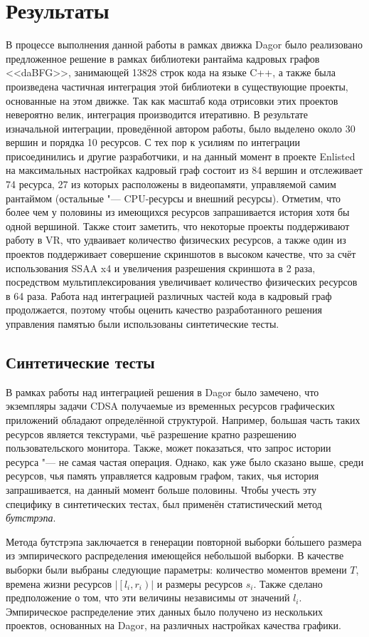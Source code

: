 \section{Результаты}
В процессе выполнения данной работы в рамках движка Dagor было реализовано предложенное решение в рамках библиотеки рантайма кадровых графов <<daBFG>>, занимающей 13828 строк кода на языке C++, а также была произведена частичная интеграция этой библиотеки в существующие проекты, основанные на этом движке.
Так как масштаб кода отрисовки этих проектов невероятно велик, интеграция производится итеративно.
В результате изначальной интеграции, проведённой автором работы, было выделено около 30 вершин и порядка 10 ресурсов.
С тех пор к усилиям по интеграции присоединились и другие разработчики, и на данный момент в проекте Enlisted на максимальных настройках кадровый граф состоит из 84 вершин и отслеживает 74 ресурса, 27 из которых расположены в видеопамяти, управляемой самим рантаймом (остальные "--- CPU-ресурсы и внешний ресурсы).
Отметим, что более чем у половины из имеющихся ресурсов запрашивается история хотя бы одной вершиной.
Также стоит заметить, что некоторые проекты поддерживают работу в VR, что удваивает количество физических ресурсов, а также один из проектов поддерживает совершение скриншотов в высоком качестве, что за счёт использования SSAA x4 и увеличения разрешения скриншота в 2 раза, посредством мультиплексирования увеличивает количество физических ресурсов в 64 раза.
Работа над интеграцией различных частей кода в кадровый граф продолжается, поэтому чтобы оценить качество разработанного решения управления памятью были использованы синтетические тесты.

\subsection{Синтетические тесты}
В рамках работы над интеграцией решения в Dagor было замечено, что экземпляры задачи CDSA получаемые из временных ресурсов графических приложений обладают определённой структурой.
Например, большая часть таких ресурсов является текстурами, чьё разрешение кратно разрешению пользовательского монитора.
Также, может показаться, что запрос истории ресурса "--- не самая частая операция.
Однако, как уже было сказано выше, среди ресурсов, чья память управляется кадровым графом, таких, чья история запрашивается, на данный момент больше половины.
Чтобы учесть эту специфику в синтетических тестах, был применён статистический метод \textit{бутстрэпа}.

Метода бутстрэпа заключается в генерации повторной выборки б\'ольшего размера из эмпирического распределения имеющейся небольшой выборки.
В качестве выборки были выбраны следующие параметры: количество моментов времени $T$, времена жизни ресурсов $\left|\left[l_i, r_i\right)\right|$ и размеры ресурсов $s_i$.
Также сделано предположение о том, что эти величины независимы от значений $l_i$.
Эмпирическое распределение этих данных было получено из нескольких проектов, основанных на Dagor, на различных настройках качества графики.

